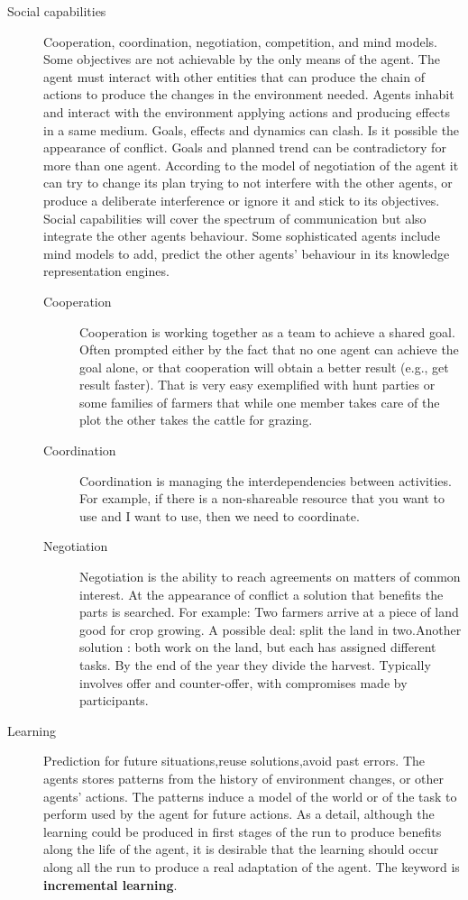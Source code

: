 \documentclass[11pt,oneside,a4paper,openright]{report}
\begin{document}
\begin{description}
	\item [Social capabilities] Cooperation, coordination, negotiation, competition, and mind models.
	Some objectives are not achievable by the only means of the agent. The agent must interact
	with other entities that can produce the chain of actions to produce the changes in the
	environment needed.
	Agents inhabit and interact with the environment applying actions and producing effects
	in a same medium. Goals, effects and dynamics can clash. Is it possible the appearance of
	conflict. Goals and planned trend can be contradictory for more than one agent. According
	to the model of negotiation of the agent it can try to change its plan trying to not interfere
	with the other agents, or produce a deliberate interference or ignore it and stick to its
	objectives.
	Social capabilities will cover the spectrum of communication but also integrate the other agents
	behaviour. Some sophisticated agents include mind models to add, predict the other agents' 
	behaviour in its knowledge representation engines.
	\begin{description}
		\item [Cooperation] Cooperation is working together as a team to achieve a shared goal.
		Often prompted either by the fact that no one agent can achieve the goal alone, or that 
		cooperation will obtain a better result (e.g., get result faster). That is very easy
		exemplified with hunt parties or some families of farmers that while one member takes care
		of the plot the other takes the cattle for grazing.

		\item [Coordination] Coordination is managing the interdependencies between activities.
		For example, if there is a non-shareable resource that you want to use and I want to use, 
		then we need to coordinate.

		\item [Negotiation] Negotiation is the ability to reach agreements on matters of common 
		interest. At the appearance of conflict a solution that benefits the parts is searched.
		For example: Two farmers arrive at a piece of land good for crop growing. A possible deal: split
		the land in two.Another solution : both work on the land, but each has assigned different
		tasks. By the end of the year they divide the harvest. Typically involves offer and 
		counter-offer, with compromises made by participants.

	\end{description}

	\item [Learning] Prediction for future situations,reuse solutions,avoid past errors. The agents stores
	patterns from the history of environment changes, or other agents' actions. The patterns induce a model
	of the world or of the task to perform used by the agent for future actions. As a detail, although the 
	learning could be produced in first stages of the run to produce benefits along the life of the agent,
	it is desirable that the learning should occur along all the run to produce a real adaptation of the 
	agent. The keyword is \textbf{incremental learning}.
\end{description}
\end{document}
